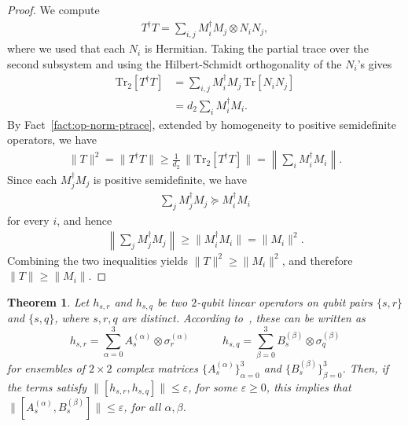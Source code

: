 \documentclass[a4paper,onecolumn,11pt]{quantumarticle}
\theoremstyle{plain}
\newtheorem{theorem}{Theorem}[section]
\newcommand{\eps}{\varepsilon}
\begin{document}
\begin{proof}
We compute
\begin{align}
    T^\dagger T
    = \sum_{i,j} M_i^\dagger M_j \otimes N_i N_j,
\end{align}
where we used that each $N_i$ is Hermitian.  Taking the partial trace over
the second subsystem and using the Hilbert-Schmidt orthogonality of the
$N_i$'s gives
\begin{align}
    \mathrm{Tr}_2[T^\dagger T]
    &= \sum_{i,j} M_i^\dagger M_j \, \mathrm{Tr}[N_i N_j] \\
    &= d_2 \sum_i M_i^\dagger M_i .
\end{align}
By Fact~\ref{fact:op-norm-ptrace}, extended by homogeneity to positive semidefinite operators, we have
\begin{align}
    \|T\|^2
    = \|T^\dagger T\|
    \geq \frac{1}{d_2}\,\bigl\|\mathrm{Tr}_2[T^\dagger T]\bigr\|
    = \left\|\sum_i M_i^\dagger M_i\right\|.
\end{align}
Since each $M_j^\dagger M_j$ is positive semidefinite, we have
\begin{align}
    \sum_j M_j^\dagger M_j \succeq M_i^\dagger M_i
\end{align}
for every $i$, and hence
\begin{align}
    \left\|\sum_j M_j^\dagger M_j\right\|
    \geq \|M_i^\dagger M_i\|
    = \|M_i\|^2 .
\end{align}
Combining the two inequalities yields $\|T\|^2 \geq \|M_i\|^2$, and
therefore $\|T\| \geq \|M_i\|$.
\end{proof}
\begin{theorem}\label{thm:comm-propagates-down}
Let $h_{s,r}$ and $h_{s,q}$ be two $2$-qubit linear operators on qubit pairs $\{s,r\}$ and $\{s,q\}$, where $s,r,q$ are distinct. According to~, these can be written as
\begin{equation}
        h_{s,r} = \sum\limits_{\alpha = 0}^{3} A_s^{(\alpha)} \otimes \sigma_r^{(\alpha)} \quad\quad\quad h_{s,q} = \sum\limits_{\beta = 0}^{3} B_s^{(\beta)} \otimes \sigma_q^{(\beta)}
    \end{equation}
for ensembles of $2 \times 2$ complex matrices $\{A_s^{(\alpha)}\}_{\alpha=0}^3$ and $\{B_s^{(\beta)}\}_{\beta=0}^3$.
Then, if the terms satisfy $\|[h_{s, r}, h_{s, q}]\| \leq \eps$, for some $\eps \geq 0$, this implies that $\|[A_s^{(\alpha)}, B_s^{(\beta)}]\| \leq \eps$, for all $\alpha, \beta$.
\end{theorem}
\end{document}

